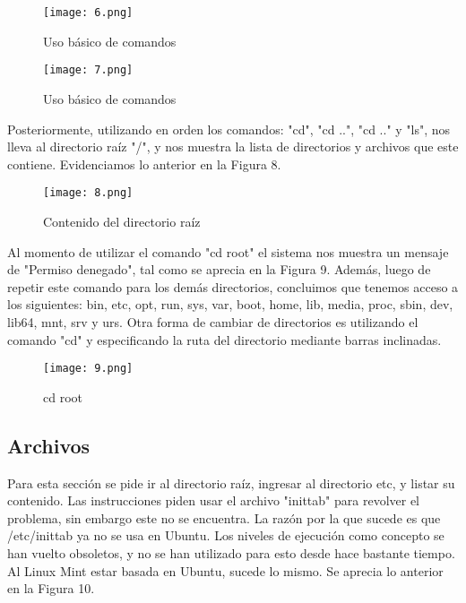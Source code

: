 \documentclass[
  letterpaper, 
  maincolor=black,
  sectioncolor=black!90,
  subsectioncolor=black!70,
  itemtextcolor=black!40,
]{fortysecondscv}
\begin{document}
\begin{center}
    \begin{figure}[H]
    \centering
    \texttt{[image: 6.png]}
    \caption{Uso básico de comandos}
    \label{fig:4.png}
    \end{figure}
\end{center}

\begin{center}
    \begin{figure}[H]
    \centering
    \texttt{[image: 7.png]}
    \caption{Uso básico de comandos}
    \label{fig:4.png}
    \end{figure}
\end{center}

{Posteriormente, utilizando en orden los comandos: "cd", "cd ..", "cd .." y "ls", nos lleva al directorio raíz "/", y nos muestra la lista de directorios y archivos que este contiene. Evidenciamos lo anterior en la Figura 8.}

\begin{center}
    \begin{figure}[H]
    \centering
    \texttt{[image: 8.png]}
    \caption{Contenido del directorio raíz}
    \label{fig:3.png}
    \end{figure}
\end{center}

{Al momento de utilizar el comando "cd root" el sistema nos muestra un mensaje de "Permiso denegado", tal como se aprecia en la Figura 9. Además, luego de repetir este comando para los demás directorios, concluimos que tenemos acceso a los siguientes: bin, etc, opt, run, sys, var, boot, home, lib, media, proc, sbin, dev, lib64, mnt, srv y urs. Otra forma de cambiar de directorios es utilizando el comando "cd" y especificando la ruta del directorio mediante barras inclinadas.}

\begin{center}
    \begin{figure}[H]
    \centering
    \texttt{[image: 9.png]}
    \caption{cd root}
    \label{fig:3.png}
    \end{figure}
\end{center}

\subsection{Archivos}

{Para esta sección se pide ir al directorio raíz, ingresar al directorio etc, y listar su contenido. Las instrucciones piden usar el archivo "inittab" para revolver el problema, sin embargo este no se encuentra. La razón por la que sucede es que /etc/inittab ya no se usa en Ubuntu. Los niveles de ejecución como concepto se han vuelto obsoletos, y no se han utilizado para esto desde hace bastante tiempo. Al Linux Mint estar basada en Ubuntu, sucede lo mismo. Se aprecia lo anterior en la Figura 10.}
\end{document}
